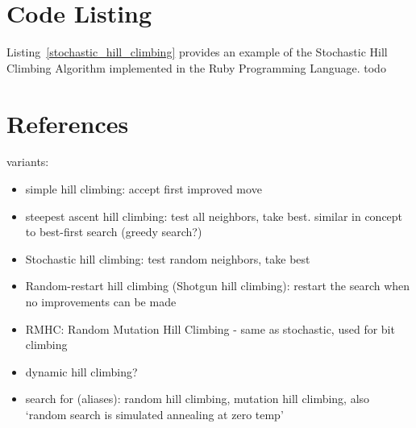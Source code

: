 \documentclass[a4paper, 11pt]{article}
\begin{document}
\section{Code Listing}
\label{sec:code}
Listing~\ref{stochastic_hill_climbing} provides an example of the Stochastic Hill Climbing Algorithm implemented in the Ruby Programming Language.
todo




\section{References}
\label{sec:references}

variants:
\begin{itemize}
	\item simple hill climbing: accept first improved move
	\item steepest ascent hill climbing: test all neighbors, take best. similar in concept to best-first search (greedy search?)
	\item Stochastic hill climbing: test random neighbors, take best
	\item Random-restart hill climbing (Shotgun hill climbing): restart the search when no improvements can be made
	\item RMHC: Random Mutation Hill Climbing - same as stochastic, used for bit climbing
	\item dynamic hill climbing?
	\item search for (aliases): random hill climbing, mutation hill climbing, also `random search is simulated annealing at zero temp'
\end{itemize}
\end{document}
